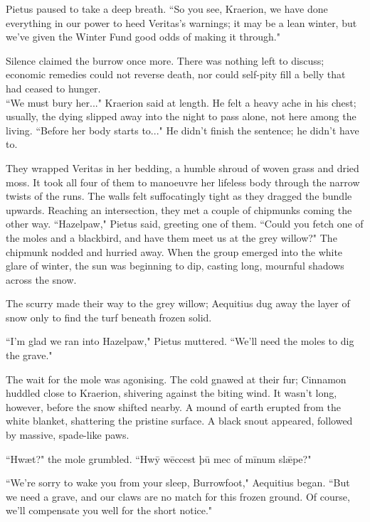 Pietus paused to take a deep breath.
``So you see, Kraerion, we have done everything in our power to heed Veritas's warnings; it may be a lean winter, but we've given the Winter Fund good odds of making it through."

Silence claimed the burrow once more.
There was nothing left to discuss; economic remedies could not reverse death, nor could self-pity fill a belly that had ceased to hunger.\\

``We must bury her..." Kraerion said at length.
He felt a heavy ache in his chest; usually, the dying slipped away into the night to pass alone, not here among the living.
``Before her body starts to..." He didn't finish the sentence; he didn't have to.

They wrapped Veritas in her bedding, a humble shroud of woven grass and dried moss.
It took all four of them to manoeuvre her lifeless body through the narrow twists of the runs.
The walls felt suffocatingly tight as they dragged the bundle upwards.
Reaching an intersection, they met a couple of chipmunks coming the other way.
``Hazelpaw," Pietus said, greeting one of them.
``Could you fetch one of the moles and a blackbird, and have them meet us at the grey willow?"
The chipmunk nodded and hurried away.
When the group emerged into the white glare of winter, the sun was beginning to dip, casting long, mournful shadows across the snow.

The scurry made their way to the grey willow; Aequitius dug away the layer of snow only to find the turf beneath frozen solid.

``I'm glad we ran into Hazelpaw," Pietus muttered.
``We'll need the moles to dig the grave."


The wait for the mole was agonising.
The cold gnawed at their fur; Cinnamon huddled close to Kraerion, shivering against the biting wind.
It wasn't long, however, before the snow shifted nearby.
A mound of earth erupted from the white blanket, shattering the pristine surface.
A black snout appeared, followed by massive, spade-like paws.

``Hwæt?" the mole grumbled.
``Hwȳ wēccest þū mec of mīnum slǣpe?"

``We're sorry to wake you from your sleep, Burrowfoot," Aequitius began.
``But we need a grave, and our claws are no match for this frozen ground.
Of course, we'll compensate you well for the short notice."

